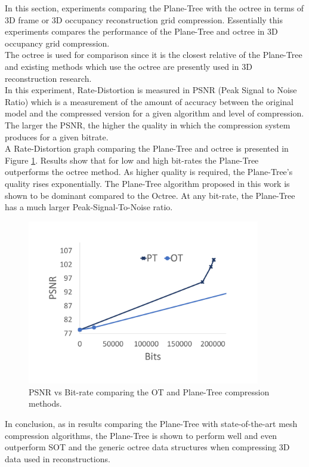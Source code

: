 
In this section, experiments comparing the Plane-Tree with the octree in terms of 3D frame or 3D occupancy reconstruction grid compression. Essentially this experiments compares the performance of the Plane-Tree and octree in 3D occupancy grid compression. \\

The octree is used for comparison since it is the closest relative of the Plane-Tree and existing methods which use the octree are presently used in 3D reconstruction research. \\

In this experiment, Rate-Distortion is measured in PSNR (Peak Signal to Noise Ratio) which is a measurement of the amount of accuracy between the original model and the compressed version for a given algorithm and level of compression. The larger the PSNR, the higher the quality in which the compression system produces for a given bitrate. \\

A Rate-Distortion graph comparing the Plane-Tree and octree is presented in Figure \ref{fig:3DReconCompression1}. Results show that for low and high bit-rates the Plane-Tree outperforms the octree method. As higher quality is required, the Plane-Tree's quality rises  exponentially. The Plane-Tree algorithm proposed in this work is shown to be dominant compared to the Octree. At any bit-rate, the Plane-Tree has a much larger Peak-Signal-To-Noise ratio. \\

\begin{figure}[!htb]
\centering
\includegraphics[width=4.0in]{images/results/compression/psnr1}
\caption{PSNR vs Bit-rate comparing the OT and Plane-Tree compression methods.}
\label{fig:3DReconCompression1}
\end{figure}

In conclusion, as in results comparing the Plane-Tree with state-of-the-art mesh compression algorithms, the Plane-Tree is shown to perform well and even outperform SOT and the generic octree data structures when compressing 3D data used in reconstructions. 
